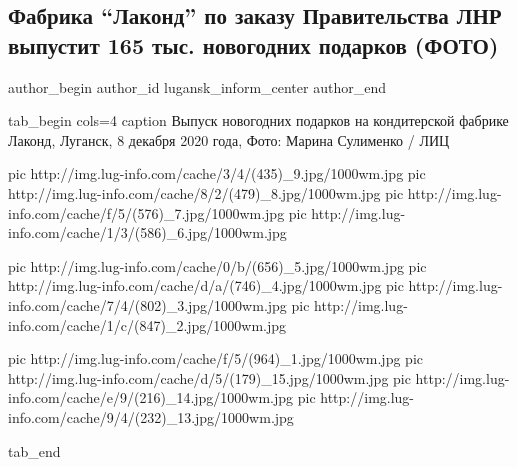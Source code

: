  
 
 
 
 
 
\subsection{Фабрика \enquote{Лаконд} по заказу Правительства ЛНР выпустит 165 тыс. новогодних подарков (ФОТО)}
\label{sec:09_12_2020.news.lnr.lug_info.1.fabrika_lakond}

\ifcmt
  author_begin
   author_id lugansk_inform_center
  author_end
\fi


\ifcmt
tab_begin cols=4
	caption Выпуск новогодних подарков на кондитерской фабрике Лаконд, Луганск, 8 декабря 2020 года, Фото: Марина Сулименко / ЛИЦ

pic http://img.lug-info.com/cache/3/4/(435)_9.jpg/1000wm.jpg
pic http://img.lug-info.com/cache/8/2/(479)_8.jpg/1000wm.jpg
pic http://img.lug-info.com/cache/f/5/(576)_7.jpg/1000wm.jpg
pic http://img.lug-info.com/cache/1/3/(586)_6.jpg/1000wm.jpg

pic http://img.lug-info.com/cache/0/b/(656)_5.jpg/1000wm.jpg
pic http://img.lug-info.com/cache/d/a/(746)_4.jpg/1000wm.jpg
pic http://img.lug-info.com/cache/7/4/(802)_3.jpg/1000wm.jpg
pic http://img.lug-info.com/cache/1/c/(847)_2.jpg/1000wm.jpg

pic http://img.lug-info.com/cache/f/5/(964)_1.jpg/1000wm.jpg
pic http://img.lug-info.com/cache/d/5/(179)_15.jpg/1000wm.jpg
pic http://img.lug-info.com/cache/e/9/(216)_14.jpg/1000wm.jpg
pic http://img.lug-info.com/cache/9/4/(232)_13.jpg/1000wm.jpg

tab_end
\fi


